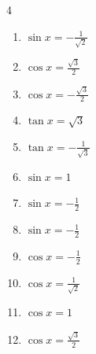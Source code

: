 \begin{multicols}{4}
\begin{enumerate}
  \item $\displaystyle \sin{x}  = -\frac{1}{\sqrt{2}}$


  \item $\displaystyle \cos{x}  = \frac{\sqrt{3}}{2}$


  \item $\displaystyle \cos{x}  = -\frac{\sqrt{3}}{2}$


  \item $\displaystyle \tan{x}  = \sqrt{3}$


  \item $\displaystyle \tan{x}  = -\frac{1}{\sqrt{3}}$


  \item $\displaystyle \sin{x}  = 1$


  \item $\displaystyle \sin{x}  = -\frac{1}{2}$


  \item $\displaystyle \sin{x}  = -\frac{1}{2}$


  \item $\displaystyle \cos{x}  = -\frac{1}{2}$


  \item $\displaystyle \cos{x}  = \frac{1}{\sqrt{2}}$


  \item $\displaystyle \cos{x}  = 1$


  \item $\displaystyle \cos{x}  = \frac{\sqrt{3}}{2}$


\end{enumerate}
\end{multicols}
